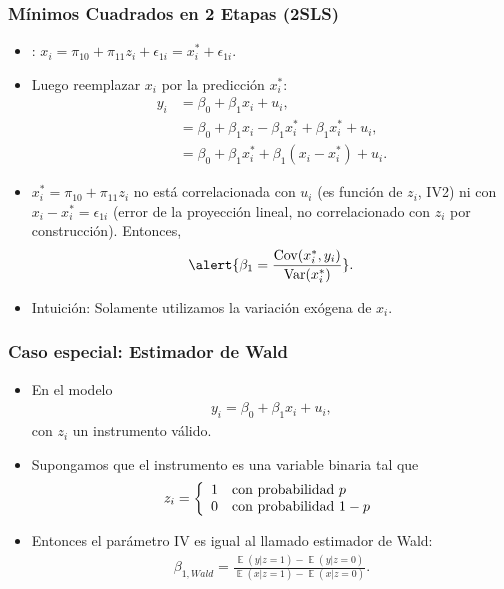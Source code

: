 \documentclass[t, compress, spanish, aspectratio=169]{beamer}
\newcommand{\term}[1]{\structure{\textbf{#1}}} %
\DeclareMathOperator{\Var}{Var}
\DeclareMathOperator{\Cov}{Cov}
\DeclareMathOperator{\E}{\mathbb{E}}
\begin{document}
	\begin{frame}
		\frametitle{M\'inimos Cuadrados en 2 Etapas (2SLS)}
		\vspace*{-0.6em}
		\begin{itemize}
			\item \term{Primera etapa}: $x_i=\pi_{10}+\pi_{11}z_i+\epsilon_{1i}=x_i^*+\epsilon_{1i}$.
			\item  Luego reemplazar $x_i$ por la predicci\'on $x_i^*$:
			\begin{align*}
				y_i&=\beta_{0}+\beta_1 x_i+u_{i},\\
				&=\beta_{0}+\beta_1x_i-\beta_1 x_i^*+\beta_1 x_i^*+u_{i},\\
				&=\beta_{0}+\beta_1 x_i^*+\beta_1(x_i-x_i^*)+u_{i}.
			\end{align*}
			\item [] $x_i^*=\pi_{10}+\pi_{11}z_i$ no est\'a correlacionada con $u_i$ (es funci\'on de $z_i$, IV2) ni con $x_i-x_i^*=\epsilon_{1i}$ (error de la proyecci\'on lineal, no correlacionado con $z_i$ por construcci\'on). Entonces,
			\begin{align*}
				\alert{ \beta_{1}=\frac{\Cov(x_i^*,y_i)}{\Var(x_i^*)} }.
			\end{align*}
			\item Intuici\'on: Solamente utilizamos la variaci\'on ex\'ogena de $x_i$.
		\end{itemize}
	\end{frame}
%
	\begin{frame}
		\frametitle{Caso especial: Estimador de Wald}
		\begin{itemize}
			\item  En el modelo
			\begin{align*}
				y_i=\beta_0 + \beta_1 x_{i}+u_i,
			\end{align*}
			con $z_i$ un instrumento v\'alido.
			\item  Supongamos que el instrumento es una variable binaria tal que
			\begin{align*}
				z_i=\left\{
				\begin{array}{c l}
					1 & \text{con probabilidad } p\\
					0 & \text{con probabilidad } 1-p
				\end{array}
				\right.
			\end{align*}
			\item  [] Entonces el par\'ametro IV es igual al llamado estimador de Wald:
			\begin{align*}
				\beta_{1, Wald}=\frac{\E(y|z=1)-\E(y|z=0)}{\E(x|z=1)-\E(x|z=0)}.
			\end{align*}
		\end{itemize}
	\end{frame}
\end{document}
